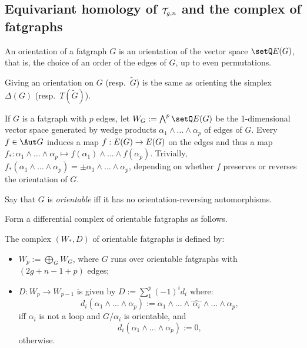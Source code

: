 \subsection{Equivariant homology of $\mathcal{T}_{g,n}$ and the complex of
  fatgraphs}
\label{sec:rg-complex}

\begin{definition}\label{dfn:orientation}
  An orientation of a fatgraph $G$ is an orientation of the vector
  space $\setQ\Edges{G}$, that is, the choice of an order of the edges of
  $G$, up to even permutations.
\end{definition}
Giving an orientation on $G$ (resp.~${\tilde G}$) is the same as
orienting the simplex $\Delta(G)$ (resp.~$T({\tilde G})$).

If $G$ is a fatgraph with $p$ edges, let $W_G := \bigwedge^p \setQ\Edges{G}$
be the 1-dimensional vector space generated by wedge products $\alpha_1 \land \ldots
\land \alpha_p$ of edges of $G$.  Every $f \in \Aut G$ induces a map $f:
E(G) \to E(G)$ on the edges and thus a map $f_*: \alpha_1 \land \ldots
\land \alpha_p \mapsto f(\alpha_1) \land \ldots \land f(\alpha_p)$.  Trivially, $f_*(\alpha_1 \land
\ldots \land \alpha_p) = \pm \alpha_1 \land \ldots \land \alpha_p$, depending on whether $f$ preserves or
reverses the orientation of $G$.

\begin{definition}\label{dfn:orientable}
  Say that $G$ is \emph{orientable} iff it has no
  orientation-reversing automorphisms.
\end{definition}

Form a differential complex of orientable fatgraphs as follows.
\begin{definition}
  The complex $(W_*, D)$ of orientable fatgraphs is defined by:
  \begin{itemize}
  \item $W_p := \bigoplus_G W_G$, where $G$ runs over orientable fatgraphs
    with $(2g + n - 1 + p)$ edges;
  \item $D: W_p \to W_{p-1}$ is given by $D := \sum_1^p (-1)^i d_i$ where:
    \begin{equation*}
      d_i(\alpha_1 \land \ldots \land \alpha_p) :=
        \alpha_1 \land \ldots \land \widehat{\,\alpha_i\,} \land
        \ldots \land \alpha_p,
    \end{equation*}
    iff $\alpha_i$ is not a loop and $G/\alpha_i$ is orientable, and
    \begin{equation*}
      d_i(\alpha_1 \land \ldots \land \alpha_p) := 0,
  \end{equation*}
  otherwise.
  \end{itemize}
\end{definition}

